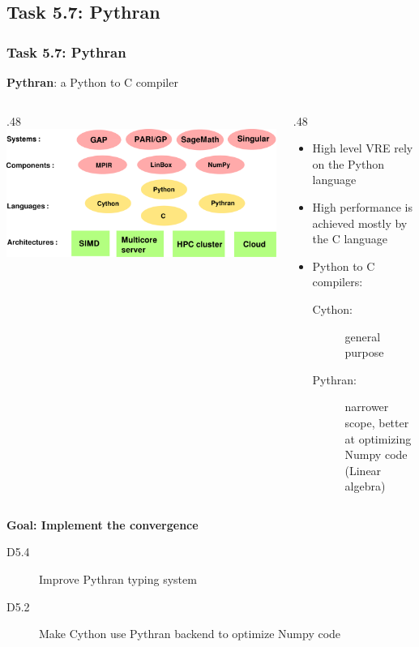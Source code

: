 \documentclass{beamer}
\begin{document}
\subsection{Task 5.7: Pythran}
\begin{frame}
  \frametitle{Task 5.7: Pythran}
  \begin{center}
    {\Large \textbf{Pythran}: a Python to C compiler}
  \end{center}
  \begin{columns}
    \begin{column}
      {.48\textwidth }
          \includegraphics[width=\textwidth]{software_stack}
    \end{column}
    \begin{column}
      {.48\textwidth }
  \begin{itemize}
  \item High level VRE rely on the Python language
  \item High performance is achieved mostly by the C language\pause
  \item Python to C compilers: 
    \begin{description}
    \item[Cython:] general purpose
    \item[Pythran:] narrower scope, better at optimizing Numpy code (Linear algebra)
    \end{description}
  \end{itemize}
    \end{column}
  \end{columns}
\pause
  \begin{center}
    \textbf{Goal: Implement the convergence}

    \begin{description}
      \item[D5.4] Improve Pythran typing system
      \item[D5.2] Make Cython use Pythran backend to optimize Numpy code
    \end{description}
  \end{center}

\end{frame}
\end{document}
